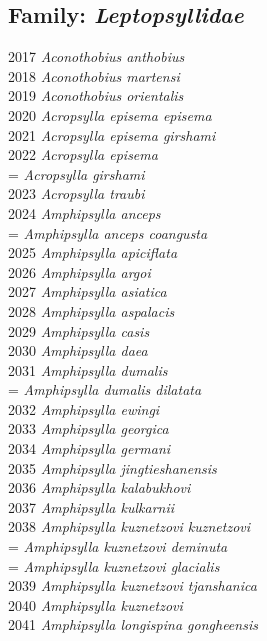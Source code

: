 \documentclass[
]{article}
\begin{document}
\hypertarget{family-leptopsyllidae}{%
\subsection{\texorpdfstring{Family:
\emph{Leptopsyllidae}}{Family: Leptopsyllidae}}\label{family-leptopsyllidae}}

2017 \emph{Aconothobius anthobius}\\
2018 \emph{Aconothobius martensi}\\
2019 \emph{Aconothobius orientalis}\\
2020 \emph{Acropsylla episema episema}\\
2021 \emph{Acropsylla episema girshami}\\
2022 \emph{Acropsylla episema}\\
= \emph{Acropsylla girshami}\\
2023 \emph{Acropsylla traubi}\\
2024 \emph{Amphipsylla anceps}\\
= \emph{Amphipsylla anceps coangusta}\\
2025 \emph{Amphipsylla apiciflata}\\
2026 \emph{Amphipsylla argoi}\\
2027 \emph{Amphipsylla asiatica}\\
2028 \emph{Amphipsylla aspalacis}\\
2029 \emph{Amphipsylla casis}\\
2030 \emph{Amphipsylla daea}\\
2031 \emph{Amphipsylla dumalis}\\
= \emph{Amphipsylla dumalis dilatata}\\
2032 \emph{Amphipsylla ewingi}\\
2033 \emph{Amphipsylla georgica}\\
2034 \emph{Amphipsylla germani}\\
2035 \emph{Amphipsylla jingtieshanensis}\\
2036 \emph{Amphipsylla kalabukhovi}\\
2037 \emph{Amphipsylla kulkarnii}\\
2038 \emph{Amphipsylla kuznetzovi kuznetzovi}\\
= \emph{Amphipsylla kuznetzovi deminuta}\\
= \emph{Amphipsylla kuznetzovi glacialis}\\
2039 \emph{Amphipsylla kuznetzovi tjanshanica}\\
2040 \emph{Amphipsylla kuznetzovi}\\
2041 \emph{Amphipsylla longispina gongheensis}\\
\end{document}
